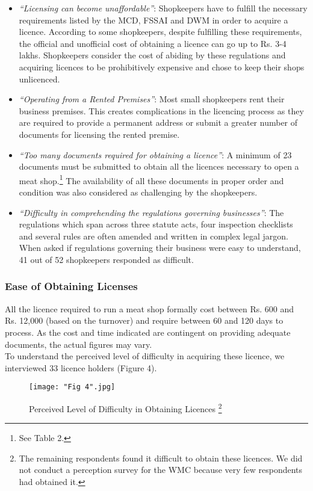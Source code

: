 \documentclass[a4paper, 12pt]{article}
\begin{document}
\begin{itemize}
\item \textit{“Licensing can become unaffordable”}: Shopkeepers have to fulfill the necessary requirements listed by the MCD, FSSAI and DWM in order to acquire a licence. According to some shopkeepers, despite fulfilling these requirements, the official and unofficial cost of obtaining a licence can go up to Rs. 3-4 lakhs. Shopkeepers consider the cost of abiding by these regulations and acquiring licences to be prohibitively expensive and chose to keep their shops unlicenced.
\item \textit{“Operating from a Rented Premises”}: Most small shopkeepers rent their business premises. This creates complications in the licencing process as they are required to provide a permanent address or submit a greater number of documents for licensing the rented premise. 
\item \textit{“Too many documents required for obtaining a licence”}: A minimum of 23 documents must be submitted to obtain all the licences necessary to open a meat shop.\footnote{ See Table 2.} The availability of all these documents in proper order and condition was also considered as challenging by the shopkeepers.
\item \textit{“Difficulty in comprehending the regulations governing businesses”}: The regulations which span across three statute acts, four inspection checklists and several rules are often amended and written in complex legal jargon. When asked if regulations governing their business were easy to understand, 41 out of 52 shopkeepers responded as difficult.
\end{itemize}

\subsubsection{Ease of Obtaining Licenses}

All the licence required to run a meat shop formally cost between Rs. 600 and Rs. 12,000 (based on the turnover) and require between 60 and 120 days to process. As the cost and time indicated are contingent on providing adequate documents, the actual figures may vary. \\

To understand the perceived level of difficulty in acquiring these licence, we interviewed 33 licence holders (Figure 4).\\

\begin{figure}[H]
\centering
\texttt{[image: "Fig 4".jpg]}
\caption[Perceived Level of Difficulty in Obtaining Licences] {Perceived Level of Difficulty in Obtaining Licences \footnote{The remaining respondents found it difficult to obtain these licences. We did not conduct a perception survey for the WMC because very few respondents had obtained it.}}
\end{figure} 
\end{document}
